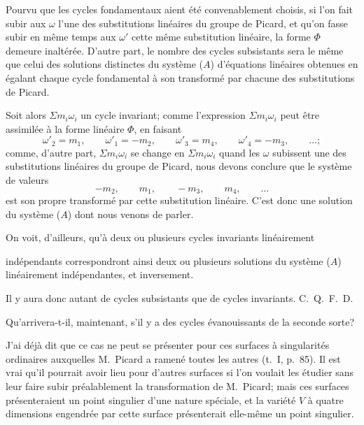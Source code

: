 \documentclass{article}
\begin{document}
Pourvu que les cycles fondamentaux aient été convenablement choisis, si l'on fait subir aux $\omega$ l'une des substitutions linéaires du groupe de Picard, et qu'on fasse subir en même temps aux $\omega'$ cette même substitution linéaire, la forme $\Phi$ demeure inaltérée. D'autre part, le nombre des cycles subsistants sera le même que celui des solutions distinctes du système ($A$) d'équations linéaires obtenues en égalant chaque cycle fondamental à son transformé par chacune des substitutions de Picard.

Soit alors $\Sigma m_{i}\omega_{i}$ un cycle invariant; comme l'expression $\Sigma m_{i}\omega_{i}$ peut être assimilée à la forme linéaire $\Phi$, en faisant
\[ \omega'_{2} = m_{1}, \qquad \omega'_{1} = -m_{2}, \qquad \omega'_{3} = m_{4}, \qquad \omega'_{4} = -m_{3}, \qquad \ldots; \]
comme, d'autre part, $\Sigma m_{i}\omega_{i}$ se change en $\Sigma m_{i}\omega_{i}$ quand les $\omega$ subissent une des substitutions linéaires du groupe de Picard, nous devons conclure que le système de valeurs
\[ -m_{2}, \qquad m_{1}, \qquad -m_{3}, \qquad m_{4}, \qquad \ldots \]
est son propre transformé par cette substitution linéaire. C'est donc une solution du système ($A$) dont nous venons de parler.

On voit, d'ailleurs, qu'à deux ou plusieurs cycles invariants linéairement

indépendants correspondront ainsi deux ou plusieurs solutions du système ($A$) linéairement indépendantes, et inversement.

Il y aura donc autant de cycles subsistants que de cycles invariants. C.~Q.~F.~D.

Qu'arrivera-t-il, maintenant, s'il y a des cycles évanouissants de la seconde sorte?

J'ai déjà dit que ce cas ne peut se présenter pour ces surfaces à singularités ordinaires auxquelles M.~Picard a ramené toutes les autres (t.\ I, p.\ 85). Il est vrai qu'il pourrait avoir lieu pour d'autres surfaces si l'on voulait les étudier sans leur faire subir préalablement la transformation de M.~Picard; mais ces surfaces présenteraient un point singulier d'une nature spéciale, et la variété $V$ à quatre dimensions engendrée par cette surface présenterait elle-même un point singulier.
\end{document}
